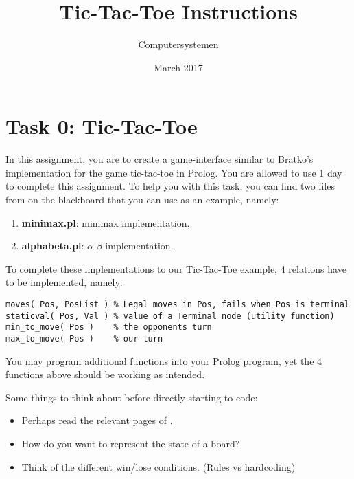 \documentclass{article}
\title{Tic-Tac-Toe Instructions}
\author{Computersystemen}
\date{March 2017}
\begin{document}
\maketitle

\section{Task 0: Tic-Tac-Toe}
In this assignment, you are to create a game-interface similar to Bratko's implementation for the game tic-tac-toe in Prolog. You are allowed to use 1 day to complete this assignment. To help you with this task, you can find two files from \citet{bratko2001prolog} on the blackboard that you can use as an example, namely:
\begin{enumerate}
    \item \textbf{minimax.pl}: minimax implementation.
    \item \textbf{alphabeta.pl}: $\alpha$-$\beta$ implementation.
\end{enumerate}

To complete these implementations to our Tic-Tac-Toe example, 4 relations have to be implemented, namely:

\begin{verbatim}
moves( Pos, PosList ) % Legal moves in Pos, fails when Pos is terminal
staticval( Pos, Val ) % value of a Terminal node (utility function)
min_to_move( Pos )    % the opponents turn
max_to_move( Pos )    % our turn
\end{verbatim}

You may program additional functions into your Prolog program, yet the 4 functions above should be working as intended.

Some things to think about before directly starting to code:
\begin{itemize}
    \item Perhaps read the relevant pages of \citet{bratko2001prolog}.
    \item How do you want to represent the state of a board?
    \item Think of the different win/lose conditions. (Rules vs hardcoding)
\end{itemize}
\end{document}
